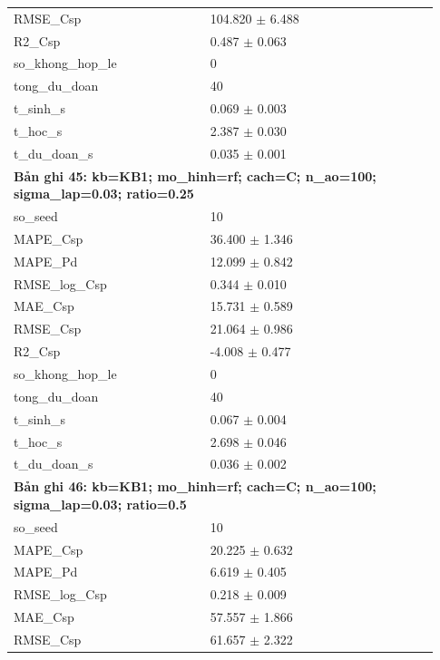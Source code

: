 \begin{longtable}{p{0.43\linewidth}p{0.50\linewidth}}
RMSE\_\allowbreak Csp & 104.820 $\pm$ 6.488 \\
R2\_\allowbreak Csp & 0.487 $\pm$ 0.063 \\
so\_\allowbreak khong\_\allowbreak hop\_\allowbreak le & 0 \\
tong\_\allowbreak du\_\allowbreak doan & 40 \\
t\_\allowbreak sinh\_\allowbreak s & 0.069 $\pm$ 0.003 \\
t\_\allowbreak hoc\_\allowbreak s & 2.387 $\pm$ 0.030 \\
t\_\allowbreak du\_\allowbreak doan\_\allowbreak s & 0.035 $\pm$ 0.001 \\
\midrule
\multicolumn{2}{p{0.95\linewidth}}{\textbf{Bản ghi 45: kb=KB1; mo\_hinh=rf; cach=C; n\_ao=100; sigma\_lap=0.03; ratio=0.25}} \\
so\_\allowbreak seed & 10 \\
MAPE\_\allowbreak Csp & 36.400 $\pm$ 1.346 \\
MAPE\_\allowbreak Pd & 12.099 $\pm$ 0.842 \\
RMSE\_\allowbreak log\_\allowbreak Csp & 0.344 $\pm$ 0.010 \\
MAE\_\allowbreak Csp & 15.731 $\pm$ 0.589 \\
RMSE\_\allowbreak Csp & 21.064 $\pm$ 0.986 \\
R2\_\allowbreak Csp & -4.008 $\pm$ 0.477 \\
so\_\allowbreak khong\_\allowbreak hop\_\allowbreak le & 0 \\
tong\_\allowbreak du\_\allowbreak doan & 40 \\
t\_\allowbreak sinh\_\allowbreak s & 0.067 $\pm$ 0.004 \\
t\_\allowbreak hoc\_\allowbreak s & 2.698 $\pm$ 0.046 \\
t\_\allowbreak du\_\allowbreak doan\_\allowbreak s & 0.036 $\pm$ 0.002 \\
\midrule
\multicolumn{2}{p{0.95\linewidth}}{\textbf{Bản ghi 46: kb=KB1; mo\_hinh=rf; cach=C; n\_ao=100; sigma\_lap=0.03; ratio=0.5}} \\
so\_\allowbreak seed & 10 \\
MAPE\_\allowbreak Csp & 20.225 $\pm$ 0.632 \\
MAPE\_\allowbreak Pd & 6.619 $\pm$ 0.405 \\
RMSE\_\allowbreak log\_\allowbreak Csp & 0.218 $\pm$ 0.009 \\
MAE\_\allowbreak Csp & 57.557 $\pm$ 1.866 \\
RMSE\_\allowbreak Csp & 61.657 $\pm$ 2.322 \\

\end{longtable}
